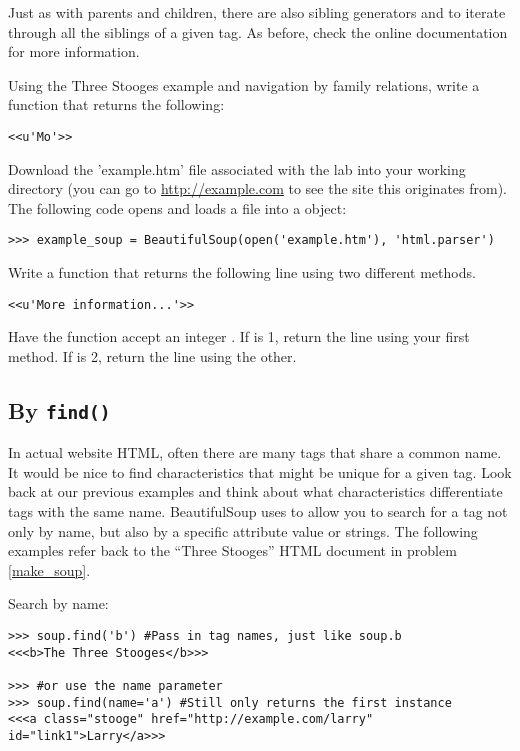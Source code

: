 Just as with parents and children, there are also sibling generators  and  to iterate through all the siblings of a given tag.
As before, check the online documentation for more information.

\begin{problem}
Using the Three Stooges example and navigation by family relations, write a function that returns the following:
\begin{lstlisting}
<<u'Mo'>>
\end{lstlisting}
\end{problem}

\begin{problem}
Download the 'example.htm' file associated with the lab into your working directory (you can go to \url{http://example.com} to see the site this originates from).
The following code opens and loads a file into a  object:
\begin{lstlisting}
>>> example_soup = BeautifulSoup(open('example.htm'), 'html.parser')
\end{lstlisting}
Write a function that returns the following line using two different methods.
\begin{lstlisting}
<<u'More information...'>>
\end{lstlisting}
Have the function accept an integer . If  is 1, return the line using your first method.
If  is 2, return the line using the other.
\end{problem}

\subsection*{By \texttt{find()}}

In actual website HTML, often there are many tags that share a common name.
It would be nice to find characteristics that might be unique for a given tag.
Look back at our previous examples and think about what characteristics differentiate tags with the same name.
BeautifulSoup uses  to allow you to search for a tag not only by name, but also by a specific attribute value or strings.
The following examples refer back to the ``Three Stooges'' HTML document in problem \ref{make_soup}.

Search by name:
\begin{lstlisting}
>>> soup.find('b') #Pass in tag names, just like soup.b
<<<b>The Three Stooges</b>>>

>>> #or use the name parameter
>>> soup.find(name='a') #Still only returns the first instance
<<<a class="stooge" href="http://example.com/larry" id="link1">Larry</a>>>

\end{lstlisting}

